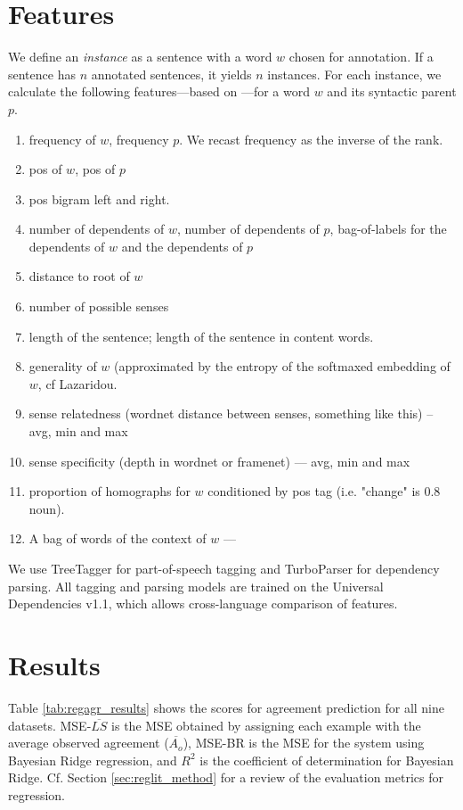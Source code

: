 \documentclass[11pt,a4paper]{article}
\begin{document}
\section{Features}
We define an \textit{instance} as a sentence with a word $w$ chosen for annotation. If a sentence has $n$ annotated sentences, it yields $n$ instances. For each instance, we calculate the following features---based on \cite{Yarowsky2002}---for a word $w$ and its syntactic parent $p$. 
\begin{enumerate}[noitemsep]
\item  frequency of $w$, frequency $p$. We recast frequency as the inverse of the rank.
\item pos of $w$, pos of $p$
\item pos bigram left and right.
\item number of dependents of $w$, number of dependents of $p$, bag-of-labels for the dependents of $w$ and the dependents of $p$
\item distance to root of $w$
\item number of possible senses 
\item length of the sentence; length of the sentence in content words.
\item generality of $w$ (approximated by the entropy of the softmaxed embedding of $w$, cf Lazaridou.
\item sense relatedness (wordnet distance between senses, something like this) -- avg, min and max
\item sense specificity (depth in wordnet or framenet) --- avg, min and max
\item proportion of homographs for $w$ conditioned by pos tag (i.e. "change" is 0.8 noun).
\item A bag of words of the context of $w$ --- 
\end{enumerate}

We use TreeTagger for part-of-speech tagging and TurboParser for dependency parsing. All tagging and parsing models are trained on the Universal Dependencies v1.1, which allows cross-language comparison of features.

\section{Results}

Table \ref{tab:regagr_results} shows the scores for agreement prediction for all nine datasets.
MSE-$ \overline{LS}$ is the MSE obtained by assigning each example with the average observed agreement ($ \overline{A_o}$),  MSE-BR is the MSE for the system using Bayesian Ridge regression, and $R^2$ is the coefficient of determination for Bayesian Ridge.
 Cf. Section \ref{sec:reglit_method} for a review of the evaluation metrics for regression.
\end{document}
